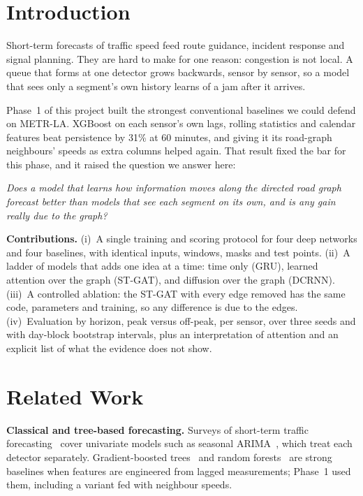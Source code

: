 \documentclass[conference]{IEEEtran}
\begin{document}
\section{Introduction}
Short-term forecasts of traffic speed feed route guidance, incident response and signal planning. They are hard to make for one reason: congestion is not local. A queue that forms at one detector grows backwards, sensor by sensor, so a model that sees only a segment's own history learns of a jam after it arrives.

Phase~1 of this project built the strongest conventional baselines we could defend on METR-LA. XGBoost on each sensor's own lags, rolling statistics and calendar features beat persistence by 31\% at 60 minutes, and giving it its road-graph neighbours' speeds as extra columns helped again. That result fixed the bar for this phase, and it raised the question we answer here:

\textit{Does a model that learns how information moves along the directed road graph forecast better than models that see each segment on its own, and is any gain really due to the graph?}

\textbf{Contributions.}
(i)~A single training and scoring protocol for four deep networks and four baselines, with identical inputs, windows, masks and test points.
(ii)~A ladder of models that adds one idea at a time: time only (GRU), learned attention over the graph (ST-GAT), and diffusion over the graph (DCRNN).
(iii)~A controlled ablation: the ST-GAT with every edge removed has the same code, parameters and training, so any difference is due to the edges.
(iv)~Evaluation by horizon, peak versus off-peak, per sensor, over three seeds and with day-block bootstrap intervals, plus an interpretation of attention and an explicit list of what the evidence does not show.

\section{Related Work}
\textbf{Classical and tree-based forecasting.} Surveys of short-term traffic forecasting~\cite{vlahogianni2014} cover univariate models such as seasonal ARIMA~\cite{williams2003}, which treat each detector separately. Gradient-boosted trees~\cite{friedman2001gbm,chen2016xgboost} and random forests~\cite{breiman2001rf} are strong baselines when features are engineered from lagged measurements; Phase~1 used them, including a variant fed with neighbour speeds.
\end{document}
